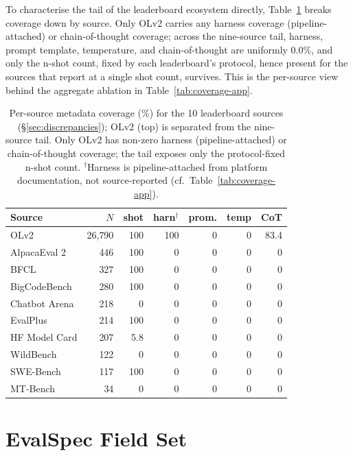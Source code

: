 \documentclass[11pt]{article}
\begin{document}
To characterise the tail of the leaderboard ecosystem directly,
Table~\ref{tab:coverage-persource} breaks coverage down by source. Only OLv2
carries any harness coverage (pipeline-attached) or chain-of-thought coverage;
across the nine-source tail, harness, prompt template, temperature, and
chain-of-thought are uniformly 0.0\%, and only the n-shot count, fixed by each
leaderboard's protocol, hence present for the sources that report at a single
shot count, survives. This is the per-source view behind the aggregate ablation
in Table~\ref{tab:coverage-app}.

\begin{table}[ht]
\centering
\small
\setlength{\tabcolsep}{4pt}
\begin{tabular}{lrrrrrr}
\toprule
Source & $N$ & shot & harn$^{\dagger}$ & prom. & temp & CoT \\
\midrule
OLv2          & 26{,}790 & 100 & 100 & 0 & 0 & 83.4 \\
\midrule
AlpacaEval 2  & 446 & 100 & 0 & 0 & 0 & 0 \\
BFCL          & 327 & 100 & 0 & 0 & 0 & 0 \\
BigCodeBench  & 280 & 100 & 0 & 0 & 0 & 0 \\
Chatbot Arena & 218 & 0   & 0 & 0 & 0 & 0 \\
EvalPlus      & 214 & 100 & 0 & 0 & 0 & 0 \\
HF Model Card & 207 & 5.8 & 0 & 0 & 0 & 0 \\
WildBench     & 122 & 0   & 0 & 0 & 0 & 0 \\
SWE-Bench     & 117 & 100 & 0 & 0 & 0 & 0 \\
MT-Bench      & 34  & 0   & 0 & 0 & 0 & 0 \\
\bottomrule
\end{tabular}
\caption{Per-source metadata coverage (\%) for the 10 leaderboard sources
(\S\ref{sec:discrepancies}); OLv2 (top) is separated from the nine-source tail.
Only OLv2 has non-zero harness (pipeline-attached) or chain-of-thought coverage;
the tail exposes only the protocol-fixed n-shot count.
$^{\dagger}$Harness is pipeline-attached from platform documentation, not
source-reported (cf.\ Table~\ref{tab:coverage-app}).}
\label{tab:coverage-persource}
\end{table}


\section{EvalSpec Field Set}
\label{app:evalspec}
\end{document}
